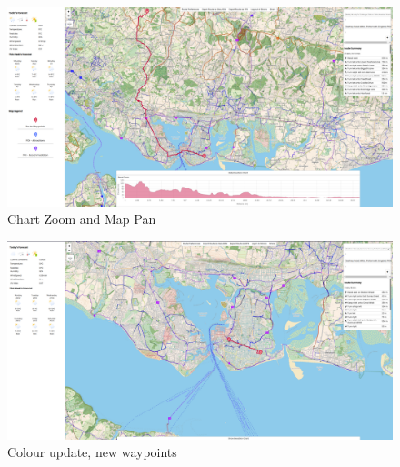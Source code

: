\begin{figure}[!ht]
    \centering
    \includegraphics[width=425px]{figures/Progress Images/Iteration-2/SR30/SR30-Zoom Elevation Chart and Fly Map to same bounds.png}
    \caption{Chart Zoom and Map Pan}
    \label{fig:chart-zoom-map-pan}
\end{figure}

\begin{figure}[!ht]
    \centering
    \includegraphics[width=425px]{figures/Progress Images/Iteration-2/SR31/SR31 Colours updated and new waypoints.png}
    \caption{Colour update, new waypoints}
    \label{fig:colours-waypoints}
\end{figure}

